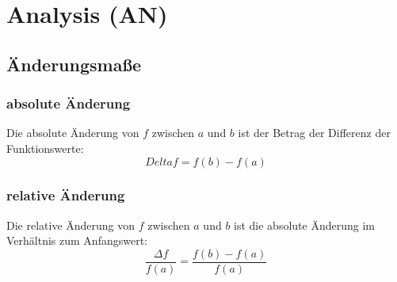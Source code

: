 \section{Analysis (AN)}
\subsection{Änderungsmaße}
\begin{minipage}{0.45\textwidth}
    \subsubsection{absolute Änderung}
        Die absolute Änderung von $f$ zwischen $a$ und $b$ ist der Betrag der Differenz der Funktionswerte:
        \begin{equation}
            Delta f = f(b) - f(a)
        \end{equation}
    \subsubsection{relative Änderung}
        Die relative Änderung von $f$ zwischen $a$ und $b$ ist die absolute Änderung im Verhältnis zum Anfangswert:
        \begin{equation}
            \frac{\Delta f}{f(a)} = \frac{f(b) - f(a)}{f(a)}
        \end{equation}
\end{minipage}
\hfill
